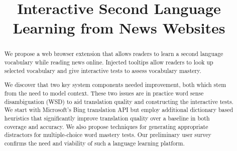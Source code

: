 \documentclass[11pt]{article}
\title{Interactive Second Language Learning from News Websites}
\date{}
\begin{document}
\maketitle
\begin{abstract}


We propose a web browser extension that allows readers to learn a
second language vocabulary while reading news online.  Injected
tooltips allow readers to look up selected vocabulary and give
interactive tests to assess vocabulary mastery.  

We discover that two key system components needed improvement, both
which stem from the need to model context.  These two issues are in
practice word sense disambiguation (WSD) to aid translation quality
and constructing the interactive tests. We start with Microsoft's Bing
translation API but employ additional dictionary based heuristics that
significantly improve translation quality over a baseline in both
coverage and accuracy. We also propose techniques for generating
appropriate distractors for multiple-choice word mastery tests.  Our
preliminary user survey confirms the need and viability of such a
language learning platform.

\end{abstract}









%
%



\end{document}
